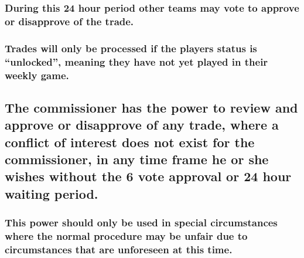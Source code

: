 \documentclass[
]{book}
\begin{document}
\hypertarget{during-this-24-hour-period-other-teams-may-vote-to-approve-or-disapprove-of-the-trade.}{%
\subsubsection{During this 24 hour period other teams may vote to approve or disapprove of the trade.}\label{during-this-24-hour-period-other-teams-may-vote-to-approve-or-disapprove-of-the-trade.}}

\hypertarget{trades-will-only-be-processed-if-the-players-status-is-unlocked-meaning-they-have-not-yet-played-in-their-weekly-game.}{%
\subsubsection{Trades will only be processed if the players status is ``unlocked'', meaning they have not yet played in their weekly game.}\label{trades-will-only-be-processed-if-the-players-status-is-unlocked-meaning-they-have-not-yet-played-in-their-weekly-game.}}

\hypertarget{the-commissioner-has-the-power-to-review-and-approve-or-disapprove-of-any-trade-where-a-conflict-of-interest-does-not-exist-for-the-commissioner-in-any-time-frame-he-or-she-wishes-without-the-6-vote-approval-or-24-hour-waiting-period.}{%
\subsection{The commissioner has the power to review and approve or disapprove of any trade, where a conflict of interest does not exist for the commissioner, in any time frame he or she wishes without the 6 vote approval or 24 hour waiting period.}\label{the-commissioner-has-the-power-to-review-and-approve-or-disapprove-of-any-trade-where-a-conflict-of-interest-does-not-exist-for-the-commissioner-in-any-time-frame-he-or-she-wishes-without-the-6-vote-approval-or-24-hour-waiting-period.}}

\hypertarget{this-power-should-only-be-used-in-special-circumstances-where-the-normal-procedure-may-be-unfair-due-to-circumstances-that-are-unforeseen-at-this-time.}{%
\subsubsection{This power should only be used in special circumstances where the normal procedure may be unfair due to circumstances that are unforeseen at this time.}\label{this-power-should-only-be-used-in-special-circumstances-where-the-normal-procedure-may-be-unfair-due-to-circumstances-that-are-unforeseen-at-this-time.}}
\end{document}
